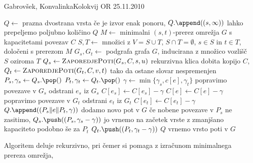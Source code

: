 \begin{naloga}{Gabrovšek, Konvalinka}{Kolokvij OR 25.11.2010}
\begin{odgovor}
\begin{enumerate}[(a)]
\begin{small}
\begin{algorithmic}
    \State $Q \gets$ prazna dvostrana vrsta
     \hfill če je izvor enak ponoru,
        \State $Q.\append((s, \infty))$
            \hfill lahko prepeljemo poljubno količino
        \State \Return $Q$
    \EndIf
    \State $M \gets$
        minimalni $(s, t)$-prerez omrežja $G$ s kapacitetami povezav $C$
    \State $S, T \gets$ množici z
        $V = S \cup T$, $S \cap T = \emptyset$, $s \in S$ in $t \in T$,
        določeni s prerezom $M$
    \State $G_s, G_t \gets$ podgrafa grafa $G$,
        inducirana z množico vozlišč $S$ oziroma $T$
        \State $Q_s \gets \text{\sc{ZaporedjePoti}}(G_s, C, s, u)$
            \hfill rekurzivna klica dobita kopijo $C$,
        \State $Q_t \gets \text{\sc{ZaporedjePoti}}(G_t, C, v, t)$
            \hfill tako da ostane slovar nespremenjen
            \State $P_s, \gamma_s \gets Q_s.\pop()$
            \State $P_t, \gamma_t \gets Q_t.\pop()$
            \State $\gamma \gets \min\{\gamma_s, c[e], \gamma_t\}$
             \hfill popravimo povezave v $G_s$
                    \State odstrani $e_s$ iz $G_s$
                \Else
                    \State $C[e_s] \gets C[e_s] - \gamma$
                \EndIf
            \EndFor
            \State $C[e] \gets C[e] - \gamma$
             \hfill popravimo povezave v $G_t$
                    \State odstrani $e_t$ iz $G_t$
                \Else
                    \State $C[e_t] \gets C[e_t] - \gamma$
                \EndIf
            \EndFor
            \State $Q.\append((P_s \| e \| P_t, \gamma))$
                \hfill dodamo novo pot v $G$
                    \hfill če nobene povezave v $P_s$ ne zasitimo,
                \State $Q_s.\push((P_s, \gamma_s - \gamma))$
                    \hfill jo vrnemo na začetek vrste
            \EndIf \hfill z zmanjšano kapaciteto
             \hfill podobno še za $P_t$
                \State $Q_t.\push((P_t, \gamma_t - \gamma))$
            \EndIf
        \EndWhile
    \EndFor
    \State \Return $Q$ \hfill vrnemo vrsto poti v $G$
\EndFunction
\end{algorithmic}
\end{small}
Algoritem deluje rekurzivno,
pri čemer si pomaga z izračunom minimalnega prereza omrežja,

\end{enumerate}
\end{odgovor}
\end{naloga}
